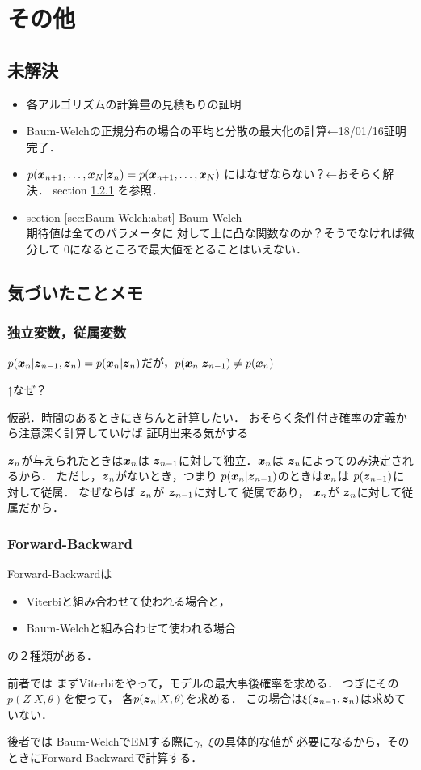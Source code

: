 \section{その他}
\label{sec:others}
\subsection{未解決}
\label{subsec:others:I-don't-know}
\begin{itemize}
\item 各アルゴリズムの計算量の見積もりの証明
\item Baum-Welchの正規分布の場合の平均と分散の最大化の計算←18/01/16証明完了．
\item $p(\mbox{\boldmath $x$}_{n+1},\dots,\mbox{\boldmath $x$}_N|\mbox{\boldmath $z$}_n)=p(\mbox{\boldmath $x$}_{n+1},\dots,\mbox{\boldmath $x$}_N)$
  にはなぜならない？←おそらく解決．
  section \ref{subsubsec:others:notice:depend-independ} を参照．\\
\item section \ref{sec:Baum-Welch:abst} Baum-Welch \\
  期待値は全てのパラメータに
  対して上に凸な関数なのか？そうでなければ微分して
  $0$になるところで最大値をとることはいえない．
\end{itemize}
\subsection{気づいたことメモ}
\label{subsec:others:notice}
\subsubsection{独立変数，従属変数}
\label{subsubsec:others:notice:depend-independ}
$p(\mbox{\boldmath $x$}_n|\mbox{\boldmath $z$}_{n-1},\mbox{\boldmath $z$}_n)=p(\mbox{\boldmath $x$}_n|\mbox{\boldmath $z$}_n)$だが，$p(\mbox{\boldmath $x$}_n|\mbox{\boldmath $z$}_{n-1})\neq p(\mbox{\boldmath $x$}_n)$

↑なぜ？

仮説．時間のあるときにきちんと計算したい．
おそらく条件付き確率の定義から注意深く計算していけば
証明出来る気がする

$\mbox{\boldmath $z$}_n$が与えられたときは$\mbox{\boldmath $x$}_n$は
$\mbox{\boldmath $z$}_{n-1}$に対して独立．$\mbox{\boldmath $x$}_n$は
$\mbox{\boldmath $z$}_n$によってのみ決定されるから．
ただし，$\mbox{\boldmath $z$}_n$がないとき，つまり
$p(\mbox{\boldmath $x$}_n|\mbox{\boldmath $z$}_{n-1})$のときは$\mbox{\boldmath $x$}_n$は
$p(\mbox{\boldmath $z$}_{n-1})$に対して従属．
なぜならば $\mbox{\boldmath $z$}_n$が $\mbox{\boldmath $z$}_{n-1}$に対して
従属であり， $\mbox{\boldmath $x$}_n$が $\mbox{\boldmath $z$}_n$に対して従属だから．
\subsubsection{Forward-Backward}
\label{subsec:others:notice:fw-bw}
Forward-Backwardは
\begin{itemize}
\item Viterbiと組み合わせて使われる場合と，
\item Baum-Welchと組み合わせて使われる場合
\end{itemize}
の２種類がある．

前者では
まずViterbiをやって，モデルの最大事後確率を求める．
つぎにその$p(Z|X,\theta)$を使って，
各$p(\mbox{\boldmath $z$}_n|X,\theta)$を求める．
この場合は$\xi(\mbox{\boldmath $z$}_{n-1},\mbox{\boldmath $z$}_n)$は求めていない．

後者では
Baum-WelchでEMする際に$\gamma$,\ $\xi$の具体的な値が
必要になるから，そのときにForward-Backwardで計算する．
